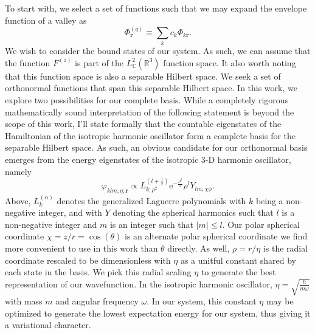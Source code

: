 To start with, we select a set of functions such that we may expand the envelope
function of a valley as
\begin{equation}
  \Phi^{(q)}_{\bm{r}}
  \equiv
  \sum_{k} c_{k} \Phi_{k\bm{r}}.
\end{equation}
We wish to consider the bound states of our system. As such, we can assume that
the function $F^{(z)}$ is part of the
$L^{2}_{\mathbb{C}}\left(\mathbb{R}^{3}\right)$ function space. It also worth
noting that this function space is also a separable Hilbert space. We seek a set
of orthonormal functions that span this separable Hilbert space. In this work,
we explore two possibilities for our complete basis. While a completely rigorous
mathematically sound interpretation of the following statement is beyond the
scope of this work, I'll state formally that the countable eigenstates of the
Hamiltonian of the isotropic harmonic oscillator form a complete basis for the
separable Hilbert space. As such, an obvious candidate for our orthonormal basis
emerges from the energy eigenstates of the isotropic 3-D harmonic oscillator,
namely
\begin{equation}
  \varphi_{klm;\eta;\bm{r}}
  \propto
  L_{k;\rho^{2}}^{\left(l+\frac{1}{2}\right)}
  \mathrm{e}^{-\frac{\rho^2}{2}}
  \rho^{l}
  Y_{lm;\chi\phi}.
\end{equation}
Above, $L_{k}^{\left(\alpha\right)}$ denotes the generalized Laguerre
polynomials with $k$ being a non-negative integer, and with $Y$ denoting the
spherical harmonics such that $l$ is a non-negative integer and $m$ is an
integer such that $\left|m\right| \le l$. Our polar spherical coordinate $\chi =
z/r = \cos\left(\theta\right)$ is an alternate polar spherical coordinate we
find more convenient to use in this work than $\theta$ directly. As well, $\rho
= r/\eta$ is the radial coordinate rescaled to be dimensionless with $\eta$ as a
unitful constant shared by each state in the basis. We pick this radial scaling
$\eta$ to generate the best representation of our wavefunction. In the isotropic
harmonic oscillator, $\eta = \sqrt{\frac{\hbar}{m\omega}}$ with mass $m$ and
angular frequency $\omega$. In our system, this constant $\eta$ may be optimized
to generate the lowest expectation energy for our system, thus giving it a
variational character.

